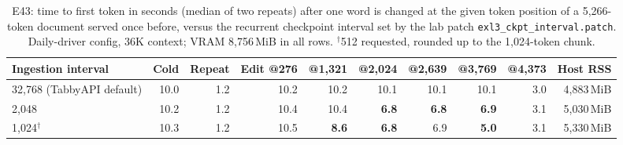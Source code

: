 \documentclass[11pt]{article}
\newcommand{\q}[1]{\texttt{#1}}
\begin{document}
\begin{table}[htbp]
\centering
\scriptsize
\setlength{\tabcolsep}{4pt}
\begin{tabular}{lrrrrrrrrr}
\toprule
Ingestion interval & Cold & Repeat & Edit @276 & @1,321 & @2,024 & @2,639 & @3,769 & @4,373 & Host RSS \\
\midrule
32,768 (TabbyAPI default) & 10.0 & 1.2 & 10.2 & 10.2 & 10.1 & 10.1 & 10.1 & 3.0 & 4,883\,MiB \\
2,048 & 10.2 & 1.2 & 10.4 & 10.4 & \textbf{6.8} & \textbf{6.8} & \textbf{6.9} & 3.1 & 5,030\,MiB \\
1,024$^{\dagger}$ & 10.3 & 1.2 & 10.5 & \textbf{8.6} & \textbf{6.8} & 6.9 & \textbf{5.0} & 3.1 & 5,330\,MiB \\
\bottomrule
\end{tabular}
\caption{E43: time to first token in seconds (median of two repeats) after
one word is changed at the given token position of a 5,266-token document
served once before, versus the recurrent checkpoint interval set by the lab
patch \q{exl3\_ckpt\_interval.patch}. Daily-driver config, 36K context; VRAM
8,756\,MiB in all rows. $^{\dagger}$512 requested, rounded up to the
1,024-token chunk.}
\label{tab:editcost}
\end{table}
\end{document}
